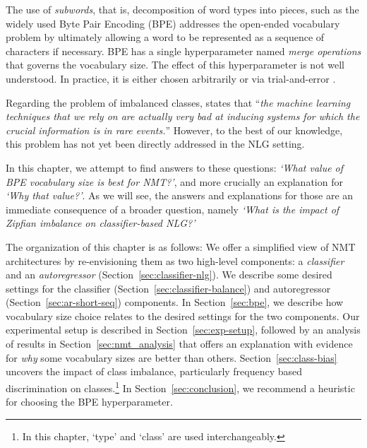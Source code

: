 The use of \textit{subwords}, that is, decomposition of word types into pieces, such as the widely used Byte Pair Encoding (BPE) \cite{sennrich-etal-2016-bpe} addresses the open-ended vocabulary problem by ultimately allowing a word to be represented as a sequence of characters if necessary.
BPE has a single hyperparameter named \textit{merge operations} that governs the vocabulary size. 
The effect of this hyperparameter is not well understood. 
In practice, it is either chosen arbitrarily or via trial-and-error \cite{DBLP:journals/corr/abs-1810-08641}.

Regarding the problem of imbalanced classes, \citet{steedman-2008-last} states that ``\textit{the machine learning techniques that we rely on are actually very bad at inducing systems for which the crucial information is in rare events.}'' 
However, to the best of our knowledge, this problem has not yet been directly addressed in the NLG setting.

In this chapter, we attempt to find answers to these questions: \textit{`What value of BPE vocabulary size is best for NMT?'}, and more crucially an explanation for \textit{`Why that value?'}.
As we will see, the answers and explanations for those are an immediate consequence of a broader question, namely \textit{`What is the impact of Zipfian imbalance on classifier-based NLG?'}

The organization of this chapter is as follows:
We offer a simplified view of NMT architectures by re-envisioning them as two high-level components: a \textit{classifier} and an \textit{autoregressor} (Section~\ref{sec:classifier-nlg}).
We describe some desired settings for the classifier (Section~\ref{sec:classifier-balance}) and autoregressor (Section~\ref{sec:ar-short-seq}) components.
In Section~\ref{sec:bpe}, we describe how vocabulary size choice relates to the desired settings for the two components. 
Our experimental setup is described in Section~\ref{sec:exp-setup}, followed by an analysis of results in Section~\ref{sec:nmt_analysis} that offers an explanation with evidence for \textit{why} some vocabulary sizes are better than others.  
Section~\ref{sec:class-bias} uncovers the impact of class imbalance, particularly frequency based discrimination on classes.\footnote{In this chapter, `type' and `class' are used interchangeably.}
In Section~\ref{sec:conclusion}, we recommend a heuristic for choosing the BPE hyperparameter.

